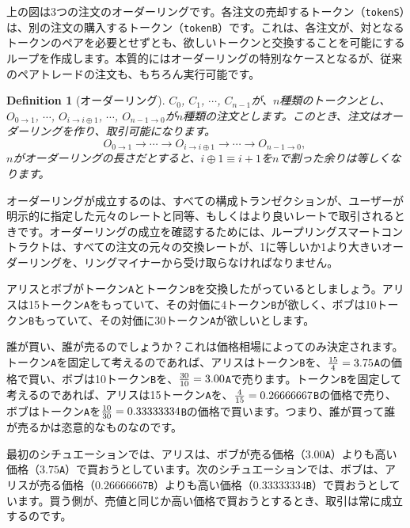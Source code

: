 \documentclass{article}
\newtheorem{definition}{Definition}[section]
\begin{document}
\begin{multicols}{2}
上の図は3つの注文のオーダーリングです。各注文の売却するトークン（\verb|tokenS|）は、別の注文の購入するトークン（\verb|tokenB|）です。これは、各注文が、対となるトークンのペアを必要とせずとも、欲しいトークンと交換することを可能にするループを作成します。本質的にはオーダーリングの特別なケースとなるが、従来のペアトレードの注文も、もちろん実行可能です。

\begin{definition}[オーダーリング] $C_{0}$, $C_{1}$, $\cdots$, $C_{n-1}$が、$n$種類のトークンとし、$O_{0\rightarrow 1}$, $\cdots$, $O_{i\rightarrow i\oplus 1}$, $\cdots$, $O_{n-1 \rightarrow 0}$が$n$種類の注文とします。このとき、注文はオーダーリングを作り、取引可能になります。
$$O_{0\rightarrow 1} \rightarrow \cdots \rightarrow O_{i\rightarrow i\oplus 1} \rightarrow \cdots \rightarrow O_{n-1\rightarrow 0} \text{, }$$
$n$がオーダーリングの長さだとすると、$i\oplus 1 \equiv i+1$を$n$で割った余りは等しくなります。
\end{definition}

オーダーリングが成立するのは、すべての構成トランゼクションが、ユーザーが明示的に指定した元々のレートと同等、もしくはより良いレートで取引されるときです。オーダーリングの成立を確認するためには、ループリングスマートコントラクトは、すべての注文の元々の交換レートが、1に等しいか1より大きいオーダーリングを、リングマイナーから受け取らなければなりません。

アリスとボブがトークン\verb|A|とトークン\verb|B|を交換したがっているとしましょう。アリスは15トークン\verb|A|をもっていて、その対価に4トークン\verb|B|が欲しく、ボブは10トークン\verb|B|もっていて、その対価に30トークン\verb|A|が欲しいとします。

誰が買い、誰が売るのでしょうか？これは価格相場によってのみ決定されます。トークン\verb|A|を固定して考えるのであれば、アリスはトークン\verb|B|を、${15 \over 4} = 3.75$\verb|A|の価格で買い、ボブは10トークン\verb|B|を、${30 \over 10} = 3.00$\verb|A|で売ります。トークン\verb|B|を固定して考えるのであれば、アリスは15トークン\verb|A|を、${4\over 15}=0.26666667$\verb|B|の価格で売り、ボブはトークン\verb|A|を${10 \over 30}=0.33333334$\verb|B|の価格で買います。つまり、誰が買って誰が売るかは恣意的なものなのです。

最初のシチュエーションでは、アリスは、ボブが売る価格（$3.00$\verb|A|）よりも高い価格（$3.75$\verb|A|）で買おうとしています。次のシチュエーションでは、ボブは、アリスが売る価格（$0.26666667$\verb|B|）よりも高い価格（$0.33333334$\verb|B|）で買おうとしています。買う側が、売値と同じか高い価格で買おうとするとき、取引は常に成立するのです。


\end{multicols}
\end{document}
